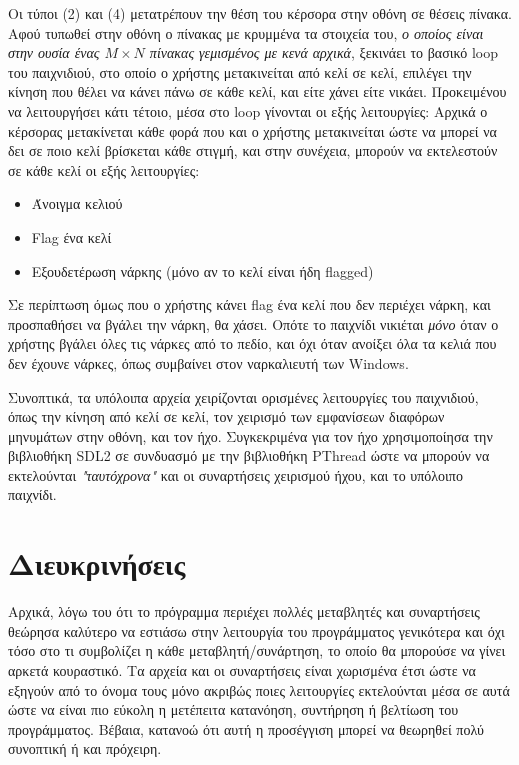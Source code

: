 \documentclass{article}
\begin{document}
    Οι τύποι (2) και (4) μετατρέπουν την θέση του κέρσορα στην οθόνη σε θέσεις πίνακα.    
    Αφού τυπωθεί στην οθόνη ο πίνακας με κρυμμένα τα στοιχεία του, \textit{ο οποίος είναι στην ουσία ένας 
    $Μ \times N$ πίνακας γεμισμένος με κενά αρχικά}, ξεκινάει το βασικό loop του παιχνιδιού, στο οποίο
    ο χρήστης μετακινείται από κελί σε κελί, επιλέγει την κίνηση που θέλει να κάνει πάνω σε κάθε κελί,
    και είτε χάνει είτε νικάει. Προκειμένου να λειτουργήσει κάτι τέτοιο, μέσα στο loop γίνονται οι εξής
    λειτουργίες: Αρχικά ο κέρσορας μετακίνεται κάθε φορά που και ο χρήστης μετακινείται ώστε να μπορεί να δει 
    σε ποιο κελί βρίσκεται κάθε στιγμή, και στην συνέχεια, μπορούν να εκτελεστούν σε κάθε κελί οι εξής λειτουργίες:
    \begin{itemize}
        \item Άνοιγμα κελιού
        \item Flag ένα κελί
        \item Εξουδετέρωση νάρκης (μόνο αν το κελί είναι ήδη flagged)
    \end{itemize}
    Σε περίπτωση όμως που ο χρήστης κάνει flag ένα κελί που δεν περιέχει νάρκη, και προσπαθήσει να βγάλει την νάρκη,
    θα χάσει. Οπότε το παιχνίδι νικιέται \textit{μόνο} όταν ο χρήστης βγάλει όλες τις νάρκες από το πεδίο, και όχι όταν
    ανοίξει όλα τα κελιά που δεν έχουνε νάρκες, όπως συμβαίνει στον ναρκαλιευτή των Windows.  

    Συνοπτικά, τα υπόλοιπα αρχεία χειρίζονται ορισμένες λειτουργίες του παιχνιδιού, όπως την κίνηση από κελί σε κελί,
    τον χειρισμό των εμφανίσεων διαφόρων μηνυμάτων στην οθόνη, και τον ήχο. Συγκεκριμένα για τον ήχο χρησιμοποίησα την
    βιβλιοθήκη SDL2 σε συνδυασμό με την βιβλιοθήκη PThread ώστε να μπορούν να εκτελούνται \textit{"ταυτόχρονα"} και οι
    συναρτήσεις χειρισμού ήχου, και το υπόλοιπο παιχνίδι. 

\section{Διευκρινήσεις}

    Αρχικά, λόγω του ότι το πρόγραμμα περιέχει πολλές μεταβλητές και συναρτήσεις θεώρησα καλύτερο να εστιάσω στην λειτουργία 
    του προγράμματος γενικότερα και όχι τόσο στο τι συμβολίζει η κάθε μεταβλητή/συνάρτηση, το οποίο θα μπορούσε
    να γίνει αρκετά κουραστικό. Τα αρχεία και οι συναρτήσεις είναι χωρισμένα έτσι ώστε να εξηγούν από το όνομα τους μόνο ακριβώς ποιες λειτουργίες
    εκτελούνται μέσα σε αυτά ώστε να είναι πιο εύκολη η μετέπειτα κατανόηση, συντήρηση ή βελτίωση του προγράμματος. Bέβαια, κατανοώ ότι
    αυτή η προσέγγιση μπορεί να θεωρηθεί πολύ συνοπτική ή και πρόχειρη.  
\end{document}
